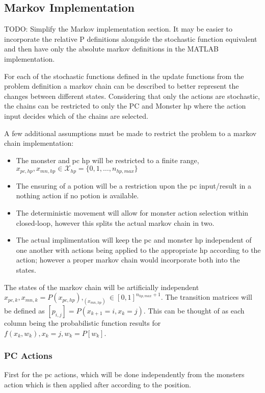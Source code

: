 \documentclass[9pt, onecolumn]{report}
\begin{document}
\subsection{Markov Implementation}

{\color{red} 
TODO: 
Simplify the Markov implementation section.
It may be easier to incorporate the relative P definitions alongside the stochastic function equivalent and then have only the absolute markov definitions in the MATLAB implementation.
}


For each of the stochastic functions defined in the update functions from the problem definition a markov chain can be described to better represent the changes between different states.
Considering that only the actions are stochastic, the chains can be restricted to only the PC and Monster hp where the action input decides which of the chains are selected.

A few additional assumptions must be made to restrict the problem to a markov chain implementation:
\begin{itemize}
    \item The monster and pc hp will be restricted to a finite range, $x_{pc,hp},x_{mn,hp} \in \mathcal{X}_{hp} = \{0,1,\dots, n_{hp,max}\}$
    \item The ensuring of a potion will be a restriction upon the pc input/result in a nothing action if no potion is available.
    \item The deterministic movement will allow for monster action selection within closed-loop, however this splits the actual markov chain in two.
    \item The actual implimentation will keep the pc and monster hp independent of one another with actions being applied to the appropriate hp according to the action; however a proper markov chain would incorporate both into the states.
\end{itemize}

The states of the markov chain will be artificially independent $x_{pc,k}, x_{mn,k} = P(x_{pc,hp}), _(x_{mn,hp}) \in [0,1]^{n_{hp,max}+1}$.
The transition matrices will be defined as $[p_{i,j}] = P(x_{k+1} = i, x_{k} = j)$.
This can be thought of as each column being the probabilistic function results for $f(x_k,w_k), x_{k} = j, w_k = P[w_k]$. 

\subsubsection{PC Actions}
First for the pc actions, which will be done independently from the monsters action which is then applied after according to the position.
\end{document}
